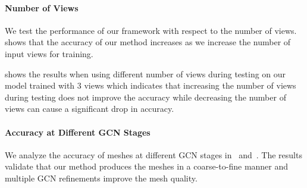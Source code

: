 


% 


% 

\paragraph{Number of Views}\vspace{-4mm}
We test the performance of our framework with respect to the number of views.
 shows that the accuracy of our method increases as we increase the number of input views for training.

 shows the results when using different number of views during testing on our model trained with 3 views
which indicates that increasing the number of views during testing does not improve the accuracy while decreasing the number of views can cause a significant drop in accuracy.


\paragraph{Accuracy at Different GCN Stages}\vspace{-2mm}
We analyze the accuracy of meshes at different GCN stages in~ and~. The results validate that our method produces the meshes in a coarse-to-fine manner and multiple GCN refinements improve the mesh quality.


